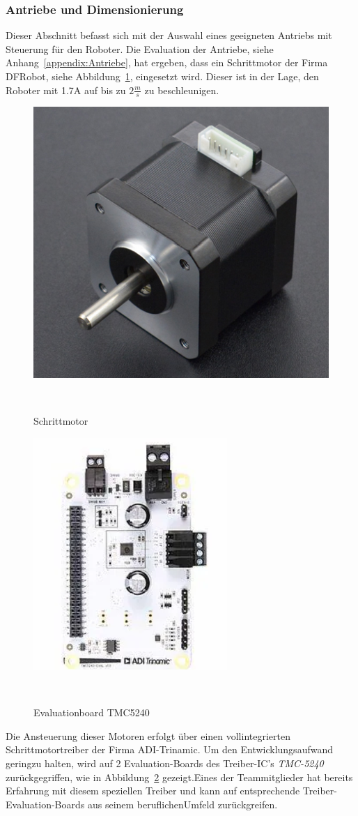 \documentclass[main.tex]{subfiles} %
\begin{document}

\subsubsection{Antriebe und Dimensionierung}

Dieser Abschnitt befasst sich mit der Auswahl eines geeigneten Antriebs mit
Steuerung für den Roboter. Die Evaluation der Antriebe,
siehe Anhang~\ref{appendix:Antriebe}, hat ergeben, dass ein Schrittmotor der
Firma DFRobot, siehe Abbildung~\ref{Schrittmotor_FIT0278}, eingesetzt wird.
Dieser ist in der Lage, den Roboter mit 1.7A auf bis zu $2\frac{m}{s}$ zu
beschleunigen.
\begin{figure}[H]
    \centering
    \includegraphics[width = 0.25 \linewidth]{fig_Antriebe_und_Dimensionierung/DFRobot_Stepper_FIT0278.png}
    \caption{Schrittmotor}~\label{Schrittmotor_FIT0278}
\end{figure}

\begin{figure}[H]
    \centering
    \includegraphics[width = 0.25 \linewidth]{fig_Antriebe_und_Dimensionierung/TMC_5240_EVAL.png}
    \caption{Evaluationboard TMC5240}~\label{Schrittmotorentreiber_EVAL}
\end{figure}

Die Ansteuerung dieser Motoren erfolgt über einen
vollintegrierten Schrittmotortreiber der Firma ADI-Trinamic. Um den
Entwicklungsaufwand geringzu halten, wird auf 2 Evaluation-Boards des
Treiber-IC's \textit{TMC-5240} zurückgegriffen, wie in
Abbildung~\ref{Schrittmotorentreiber_EVAL} gezeigt.Eines der Teammitglieder hat
bereits Erfahrung mit diesem speziellen Treiber und kann auf entsprechende
Treiber-Evaluation-Boards aus seinem beruflichenUmfeld zurückgreifen.
\end{document}
